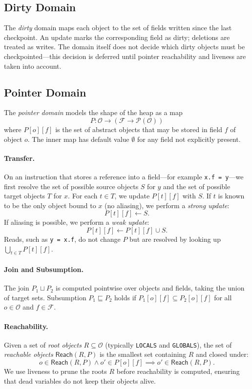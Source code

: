 \subsection{Dirty Domain}
The \emph{dirty} domain maps each object to the set of fields written since the last checkpoint.
An update marks the corresponding field as dirty; deletions are treated as writes.
The domain itself does not decide which dirty objects must be checkpointed—this decision is deferred until pointer reachability and liveness are taken into account.
\subsection{Pointer Domain}
The \emph{pointer domain} models the shape of the heap as a map
\[
P : \mathcal{O} \to (\mathcal{F} \to \mathcal{P}(\mathcal{O}))
\]
where $P[o][f]$ is the set of abstract objects that may be stored in field $f$ of object $o$.
The inner map has default value $\emptyset$ for any field not explicitly present.

\paragraph{Transfer.}
On an instruction that stores a reference into a field---for example \texttt{x.f = y}---we first resolve the set of possible source objects $S$ for $y$ and the set of possible target objects $T$ for $x$.
For each $t \in T$, we update $P[t][f]$ with $S$.
If $t$ is known to be the only object bound to $x$ (no aliasing), we perform a \emph{strong update}:
\[
P[t][f] \leftarrow S.
\]
If aliasing is possible, we perform a \emph{weak update}:
\[
P[t][f] \leftarrow P[t][f] \cup S.
\]
Reads, such as \texttt{y = x.f}, do not change $P$ but are resolved by looking up $\bigcup_{t \in T} P[t][f]$.

\paragraph{Join and Subsumption.}
The join $P_1 \sqcup P_2$ is computed pointwise over objects and fields, taking the union of target sets.
Subsumption $P_1 \sqsubseteq P_2$ holds if $P_1[o][f] \subseteq P_2[o][f]$ for all $o \in \mathcal{O}$ and $f \in \mathcal{F}$.

\paragraph{Reachability.}
Given a set of \emph{root objects} $R \subseteq \mathcal{O}$ (typically \texttt{LOCALS} and \texttt{GLOBALS}), the set of \emph{reachable objects} $\mathsf{Reach}(R, P)$ is the smallest set containing $R$ and closed under:
\[
o \in \mathsf{Reach}(R, P) \wedge o' \in P[o][f] \implies o' \in \mathsf{Reach}(R, P).
\]
We use liveness to prune the roots $R$ before reachability is computed, ensuring that dead variables do not keep their objects alive.

